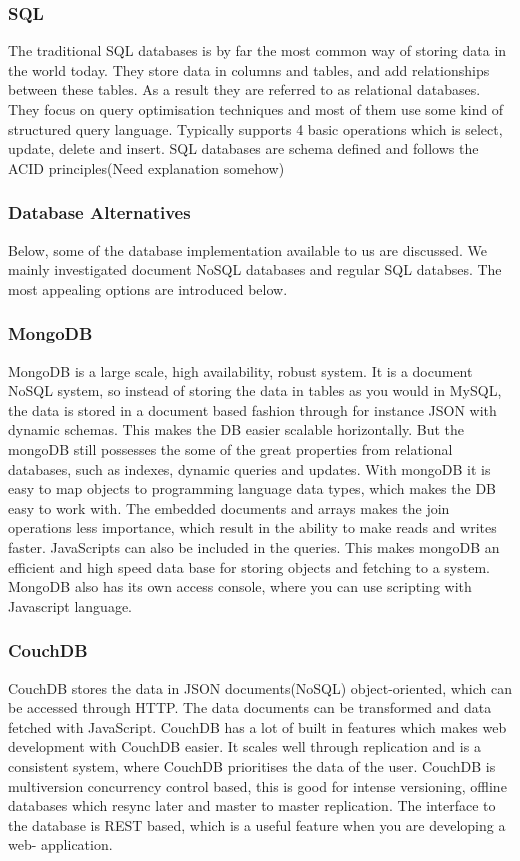 \subsubsection*{SQL}
The traditional SQL databases is by far the most common way of storing data in the world today. They store data in columns and tables, and add relationships between these tables. As a result they are referred to as relational databases. They focus on query optimisation techniques and most of them use some kind of structured query language. Typically supports 4 basic operations which is select, update, delete and insert. SQL databases are schema defined and follows the ACID principles(Need explanation somehow)

\subsubsection{Database Alternatives}
Below, some of the database implementation available to us are discussed. We mainly investigated document NoSQL databases and regular SQL databses. The most appealing options are introduced below.

\subsubsection*{MongoDB}
MongoDB is a large scale, high availability, robust system. It is a document NoSQL system, so instead of storing the data in tables as you would in MySQL, the data is stored in a document based fashion through for instance JSON with dynamic schemas. This makes the DB easier scalable horizontally. But the mongoDB still possesses the some of the great properties from relational databases, such as indexes, dynamic queries and updates. With mongoDB it is easy to map objects to programming language data types, which makes the DB easy to work with. The embedded documents and arrays makes the join operations less importance, which result in the ability to make reads and writes faster. JavaScripts can also be included in the queries. This makes mongoDB an efficient and high speed data base for storing objects and fetching to a system. MongoDB also has its own access console, where you can use scripting with Javascript language. \cite{mongodb-intro}

\subsubsection*{CouchDB}
CouchDB stores the data in JSON documents(NoSQL) object-oriented, which can be accessed through HTTP. The data documents can be transformed and data fetched with JavaScript. CouchDB has a lot of built in features which makes web development with CouchDB easier. It scales well through replication and is a consistent system, where CouchDB prioritises the data of the user. CouchDB is multiversion concurrency control based, this is good for intense versioning, offline databases which resync later and master to master replication. The interface to the database is REST based, which is a useful feature when you are developing a web- application.
\cite{couchdb-about, couchdb-technical}

